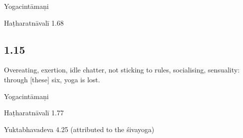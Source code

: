 \begin{ekdosis}
\begin{sources}[hp01_014]
\end{sources}

\begin{testimonia}[hp01_014]
Yogacintāmaṇi

\begin{versinnote}
\end{versinnote}

Haṭharatnāvalī 1.68

\begin{versinnote}
\end{versinnote}

\end{testimonia}


\subsection*{1.15}
\begin{translation}[hp01_015]
Overeating, exertion, idle chatter, not sticking to rules, socialising, sensuality: through [these] six, yoga is lost.
\end{translation}

\begin{testimonia}[hp01_015]
Yogacintāmaṇi

\begin{versinnote}
\end{versinnote}

Haṭharatnāvalī 1.77

\begin{versinnote}
\end{versinnote}

Yuktabhavadeva 4.25 (attributed to the śivayoga)


\end{testimonia}
\end{ekdosis}
